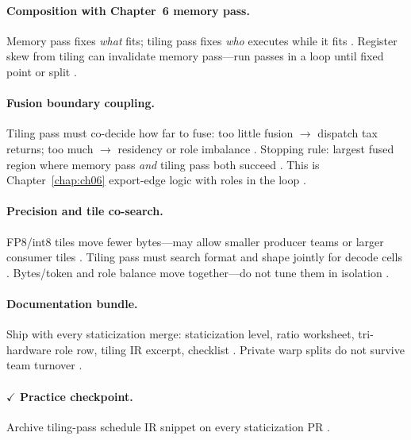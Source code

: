 \paragraph{Composition with Chapter~6 memory pass.}
Memory pass fixes \emph{what} fits; tiling pass fixes \emph{who} executes while it fits \citep{yirage2026,dao2022flashattention}.
Register skew from tiling can invalidate memory pass---run passes in a loop until fixed point or split \citep{chen2020compilerbasedhardw,memoryfloor2026,shah2024flashattention3}.

\paragraph{Fusion boundary coupling.}
Tiling pass must co-decide how far to fuse: too little fusion $\rightarrow$ dispatch tax returns; too much $\rightarrow$ residency or role imbalance \citep{taxbreak2026,memoryfloor2026,yirage2026}.
Stopping rule: largest fused region where memory pass \emph{and} tiling pass both succeed \citep{wu2024mirage,shah2024flashattention3,chen2020compilerbasedhardw}.
This is Chapter~\ref{chap:ch06} export-edge logic with roles in the loop \citep{dao2022flashattention,patel2025llminference}.

\paragraph{Precision and tile co-search.}
FP8/int8 tiles move fewer bytes---may allow smaller producer teams or larger consumer tiles \citep{shah2024flashattention3,dlbook}.
Tiling pass must search format and shape jointly for decode cells \citep{memoryfloor2026,yirage2026}.
Bytes/token and role balance move together---do not tune them in isolation \citep{taxbreak2026,patel2025llminference}.

\paragraph{Documentation bundle.}
Ship with every staticization merge: staticization level, ratio worksheet, tri-hardware role row, tiling IR excerpt, checklist \citep{yirage2026,chen2020compilerbasedhardw,shah2024flashattention3,taxbreak2026,patel2025llminference}.
Private warp splits do not survive team turnover \citep{mpk2025,wu2024mirage}.

\paragraph{$\checkmark$ Practice checkpoint.}
Archive tiling-pass schedule IR snippet on every staticization PR \citep{yirage2026,wu2024mirage}.

